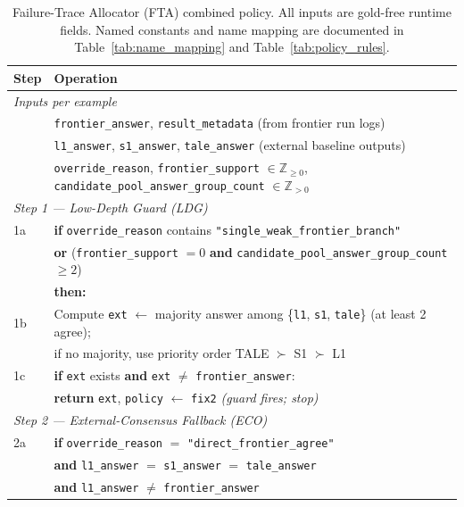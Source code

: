\begin{table}[t]
\centering
\caption{Failure-Trace Allocator (FTA) combined policy.
All inputs are gold-free runtime fields.
Named constants and name mapping are documented in
Table~\ref{tab:name_mapping} and Table~\ref{tab:policy_rules}.}
\label{alg:fix24}
\scriptsize
\begin{tabular}{p{} p{}}
\toprule
\textbf{Step} & \textbf{Operation} \\
\midrule
\multicolumn{2}{l}{\textit{Inputs per example}} \\
& \texttt{frontier\_answer}, \texttt{result\_metadata} (from frontier run logs) \\
& \texttt{l1\_answer}, \texttt{s1\_answer}, \texttt{tale\_answer} (external baseline outputs) \\
& \texttt{override\_reason}, \texttt{frontier\_support} $\in \mathbb{Z}_{\geq 0}$, \texttt{candidate\_pool\_answer\_group\_count} $\in \mathbb{Z}_{>0}$ \\
\midrule
\multicolumn{2}{l}{\textit{Step 1 --- Low-Depth Guard (LDG)}} \\
1a & \textbf{if} \texttt{override\_reason} contains \texttt{"single\_weak\_frontier\_branch"} \\
   & \quad \textbf{or} (\texttt{frontier\_support} $= 0$ \textbf{and} \texttt{candidate\_pool\_answer\_group\_count} $\geq 2$) \\
   & \textbf{then:} \\
1b & \quad Compute \texttt{ext} $\leftarrow$ majority answer among \{\texttt{l1}, \texttt{s1}, \texttt{tale}\} (at least 2 agree); \\
   & \quad if no majority, use priority order TALE $\succ$ S1 $\succ$ L1 \\
1c & \quad \textbf{if} \texttt{ext} exists \textbf{and} \texttt{ext} $\neq$ \texttt{frontier\_answer}: \\
   & \quad\quad \textbf{return} \texttt{ext}, \texttt{policy} $\leftarrow$ \texttt{fix2} \quad\quad \textit{(guard fires; stop)} \\
\midrule
\multicolumn{2}{l}{\textit{Step 2 --- External-Consensus Fallback (ECO)}} \\
2a & \textbf{if} \texttt{override\_reason} $=$ \texttt{"direct\_frontier\_agree"} \\
   & \quad \textbf{and} \texttt{l1\_answer} $=$ \texttt{s1\_answer} $=$ \texttt{tale\_answer} \\
   & \quad \textbf{and} \texttt{l1\_answer} $\neq$ \texttt{frontier\_answer} \\

\end{tabular}
\end{table}
